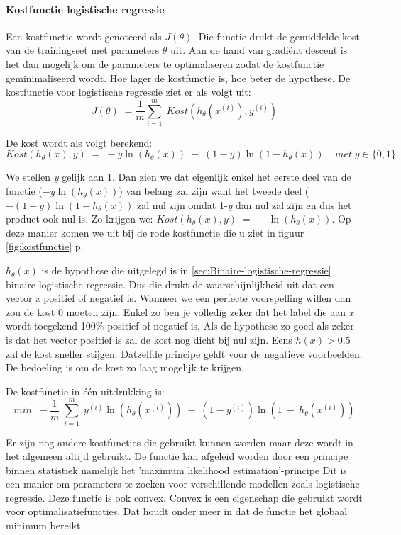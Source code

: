 \paragraph{Kostfunctie logistische regressie}
\label{par:kostfunctie-log}
Een kostfunctie wordt genoteerd als $J(\theta)$. Die functie drukt de gemiddelde kost van de trainingsset met parameters $\theta$ uit. Aan de hand van gradiënt descent is het dan mogelijk om de parameters te optimaliseren zodat de kostfunctie geminimaliseerd wordt. Hoe lager de kostfunctie is, hoe beter de hypothese.
De kostfunctie voor logistische regressie ziet er als volgt uit: 
$$ 
J(\theta) \; = \frac{1}{m}\sum_{i=1}^{m} \;   Kost (h_{\theta}(x^{(i)}), y^{(i)} )  
$$

De kost wordt als volgt berekend:
$$Kost (h_{\theta}(x), y) \; = \; -y\ln(h_{\theta}(x)) \;- \;(1-y) \ln(1-h_{\theta}(x))  \;\;\;\; met \; y \in \{0,1\}$$

We stellen \textit{y} gelijk aan 1. Dan zien we dat eigenlijk enkel het eerste deel van de functie ($-y\ln(h_{\theta}(x))$) van belang zal zijn want het tweede deel ($- (1-y) \ln(1-h_{\theta}(x))$ zal nul zijn omdat 1-\textit{y} dan nul zal zijn en dus het product ook nul is. Zo krijgen we: 
\newline $Kost (h_{\theta}(x), y) \; = \; -\ln(h_{\theta}(x))$. Op deze manier komen we uit bij de rode kostfunctie die u ziet in figuur \ref{fig:kostfunctie} p\pageref{fig:kostfunctie}.

$h_{\theta}(x)$ is de hypothese die uitgelegd is in \ref{sec:Binaire-logistische-regressie} binaire logistische regressie. Dus die drukt de waarschijnlijkheid uit dat een vector \textit{x} positief of negatief is. Wanneer we een perfecte voorspelling willen dan zou de kost 0 moeten zijn. Enkel zo ben je volledig zeker dat het label die aan \textit{x} wordt toegekend 100\% positief of negatief is. Als de hypothese zo goed als zeker is dat het vector positief is zal de kost nog dicht bij nul zijn. Eens $h(x) > 0.5$ zal de kost sneller stijgen. Datzelfde principe geldt voor de negatieve voorbeelden. De bedoeling is om de kost zo laag mogelijk te krijgen.

De kostfunctie in één uitdrukking is: 
$$ 
min \;\; -\frac{1}{m}\;\sum_{i=1}^{m} \;  y^{(i)}\ln(h_{\theta}(x^{(i)})) \;- \;(1-y^{(i)}) \ln(1\:-\:h_{\theta}(x^{(i)}))  
$$

Er zijn nog andere kostfuncties die gebruikt kunnen worden maar deze wordt in het algemeen altijd gebruikt.
De functie kan afgeleid worden door een principe binnen statistiek namelijk het 'maximum likelihood estimation'-principe Dit is een manier om parameters te zoeken voor verschillende modellen zoals logistische regressie. Deze functie is ook convex. Convex is een eigenschap die gebruikt wordt voor optimalisatiefuncties. Dat houdt onder meer in dat de functie het globaal minimum bereikt. 

